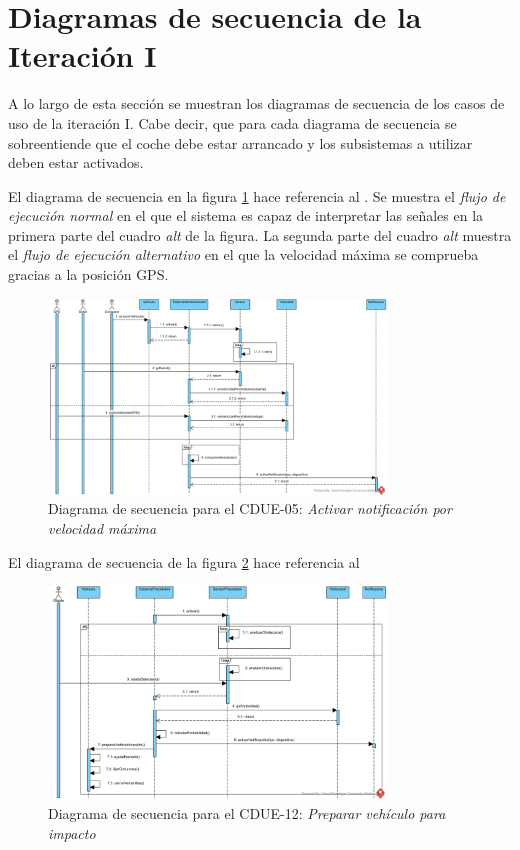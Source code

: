 \section{Diagramas de secuencia de la Iteración I}

\par A lo largo de esta sección se muestran los diagramas de secuencia de los casos de uso de la iteración I. Cabe decir, que para cada diagrama de secuencia se sobreentiende que el coche debe estar arrancado y los subsistemas a utilizar deben estar activados.

\par El diagrama de secuencia  en la figura \ref{img:notif_velocidad_max} hace referencia al . Se muestra el \textit{flujo de ejecución normal} en el que el sistema es capaz de interpretar las señales en la primera parte del cuadro \textit{alt} de la figura. La segunda parte del cuadro \textit{alt} muestra el \textit{flujo de ejecución alternativo} en el que la velocidad máxima se comprueba gracias a la posición GPS.

\begin{figure}[h]
  \begin{center}
    \includegraphics[width=0.8\textwidth]{./img/diagramas_de_secuencia/CDUE-05.png}
  \end{center}
  \caption{Diagrama de secuencia para el CDUE-05: \textit{Activar notificación por velocidad máxima}}
  \label{img:notif_velocidad_max}
\end{figure}

\par El diagrama de secuencia de la figura \ref{img:prep_vehiculo_impacto} hace referencia al 

\begin{figure}[h]
  \begin{center}
    \includegraphics[width=0.8\textwidth]{./img/diagramas_de_secuencia/CDUE-12.png}
  \end{center}
  \caption{Diagrama de secuencia para el CDUE-12: \textit{Preparar vehículo para impacto}}
  \label{img:prep_vehiculo_impacto}
\end{figure}
